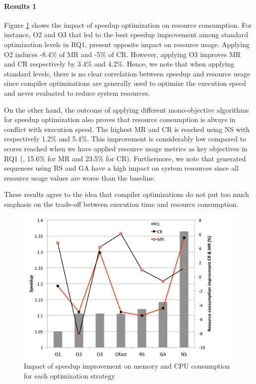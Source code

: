 \paragraph{Results 1}

Figure \ref{fig:rq3.pdf} shows the impact of speedup optimization on resource consumption. For instance, O2 and O3 that led to the best speedup improvement among standard optimization levels in RQ1, present opposite impact on resource usage. Applying O2 induces -8.4\% of MR and -5\% of CR. However, applying O3 improves MR and CR respectively by 3.4\% and 4.2\%. Hence, we note that when applying standard levels, there is no clear correlation between speedup and resource usage since compiler optimizations are generally used to optimize the execution speed and never evaluated to reduce system resources.

On the other hand, the outcome of applying different mono-objective algorithms for speedup optimization also proves that resource consumption is always in conflict with execution speed. The highest MR and CR is reached using NS with respectively 1.2\% and 5.4\%. This improvement is considerably low compared to scores reached when we have applied resource usage metrics as key objectives in RQ1 (\ie, 15.6\% for MR and 23.5\% for CR). Furthermore, we note that generated sequences using RS and GA have a high impact on system resources since all resource usage values are worse than the baseline.

These results agree to the idea that compiler optimizations do not put too much emphasis on the trade-off between execution time and resource consumption.


\begin{figure}[h]
		\centering
		\includegraphics[width=0.9\linewidth]{chapitre3/fig/rq3.pdf}
		\caption{Impact of speedup improvement on memory and CPU consumption for each optimization strategy}
		\label{fig:rq3.pdf}
\end{figure}


